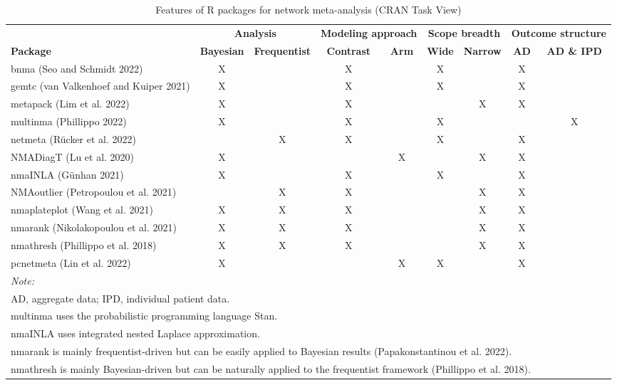 \begin{table}

\caption{\label{tab:table-one}Features of R packages for network meta-analysis (CRAN Task View)}
\centering
\fontsize{7}{9}\selectfont
\begin{tabular}[t]{lcccccccc}
\toprule
\multicolumn{1}{c}{\textbf{}} & \multicolumn{2}{c}{\textbf{Analysis}} & \multicolumn{2}{c}{\textbf{Modeling approach}} & \multicolumn{2}{c}{\textbf{Scope breadth}} & \multicolumn{2}{c}{\textbf{Outcome structure}} \\
\cmidrule(l{3pt}r{3pt}){2-3} \cmidrule(l{3pt}r{3pt}){4-5} \cmidrule(l{3pt}r{3pt}){6-7} \cmidrule(l{3pt}r{3pt}){8-9}
\textbf{Package} & \textbf{Bayesian} & \textbf{Frequentist} & \textbf{Contrast} & \textbf{Arm} & \textbf{Wide} & \textbf{Narrow} & \textbf{AD} & \textbf{AD \& IPD}\\
\midrule
bnma (Seo and Schmidt 2022) & X &  & X &  & X &  & X & \\
gemtc (van Valkenhoef and Kuiper 2021) & X &  & X &  & X &  & X & \\
metapack (Lim et al. 2022) & X &  & X &  &  & X & X & \\
multinma (Phillippo 2022) & X &  & X &  & X &  &  & X\\
netmeta (Rücker et al. 2022) &  & X & X &  & X &  & X & \\
\addlinespace
NMADiagT (Lu et al. 2020) & X &  &  & X &  & X & X & \\
nmaINLA (Günhan 2021) & X &  & X &  & X &  & X & \\
NMAoutlier (Petropoulou et al. 2021) &  & X & X &  &  & X & X & \\
nmaplateplot (Wang et al. 2021) & X & X & X &  &  & X & X & \\
nmarank (Nikolakopoulou et al. 2021) & X & X & X &  &  & X & X & \\
\addlinespace
nmathresh (Phillippo et al. 2018) & X & X & X &  &  & X & X & \\
pcnetmeta (Lin et al. 2022) & X &  &  & X & X &  & X & \\
\bottomrule
\multicolumn{9}{l}{\rule{0pt}{1em}\textit{Note: }}\\
\multicolumn{9}{l}{\rule{0pt}{1em}AD, aggregate data; IPD, individual patient data.}\\
\multicolumn{9}{l}{\rule{0pt}{1em}multinma uses the probabilistic programming language Stan.}\\
\multicolumn{9}{l}{\rule{0pt}{1em}nmaINLA uses integrated nested Laplace approximation.}\\
\multicolumn{9}{l}{\rule{0pt}{1em}nmarank is mainly frequentist-driven but can be easily applied to Bayesian results (Papakonstantinou et al. 2022).}\\
\multicolumn{9}{l}{\rule{0pt}{1em}nmathresh is mainly Bayesian-driven but can be naturally applied to the frequentist framework (Phillippo et al. 2018).}\\
\end{tabular}
\end{table}

